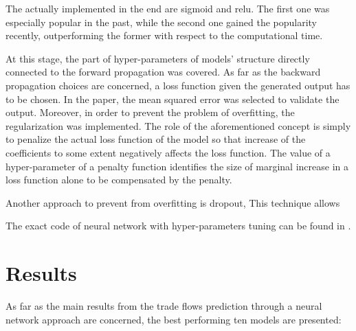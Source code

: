 \documentclass{Trade_template}
\numberwithin{equation}{section}
\begin{document}

The actually implemented in the end are sigmoid and relu. The first one was especially popular in the past, while the second one gained the popularity recently, outperforming the former with respect to the computational time.

At this stage, the part of hyper-parameters of models’ structure directly connected to the forward propagation was covered. As far as the backward propagation choices are concerned, a loss function given the generated output has to be chosen. In the paper, the mean squared error was selected to validate the output. Moreover, in order to prevent the problem of overfitting, the regularization was implemented. The role of the aforementioned concept is simply to penalize the actual loss function of the model so that increase of the coefficients to some extent negatively affects the loss function. The value of a hyper-parameter of a penalty function identifies the size of marginal increase in a loss function alone to be compensated by the penalty. 

\bigskip

Another approach to prevent from overfitting is dropout, This technique allows

The exact code of neural network with hyper-parameters tuning can be found in .

\chapter{Results}

As far as the main results from the trade flows prediction through a neural network approach are concerned, the best performing ten models are presented:
\end{document}
